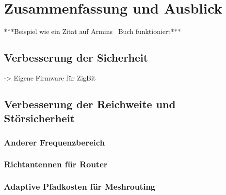 
\chapter{Zusammenfassung und Ausblick}
***Beispiel wie ein Zitat auf Armins~\citep{Bolz} Buch funktioniert***
\section{Verbesserung der Sicherheit}
-> Eigene Firmware für ZigBit

\section{Verbesserung der Reichweite und Störsicherheit}
\subsection{Anderer Frequenzbereich}
\subsection{Richtantennen für Router}
\subsection{Adaptive Pfadkosten für Meshrouting}
